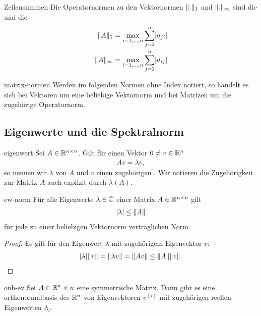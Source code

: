 \begin{Beispiel}{Zeilensummen}
  Die Operatornormen zu den Vektornormen $\lVert.\rVert_1$ und
  $\lVert.\rVert_\infty$ sind die  und die
  \begin{align}
    \lVert A\rVert_1 &= \max_{i=1,\dots,n} \sum_{j=1}^n \lvert a_{ji}\rvert\\
    \lVert A\rVert_\infty &= \max_{i=1,\dots,n} \sum_{j=1}^n \lvert a_{ij}\rvert
  \end{align}
\end{Beispiel}

\begin{Notation}{matrix-normen}
  Werden im folgenden Normen ohne Index notiert, so handelt es sich
  bei Vektoren um eine beliebige Vektornorm und bei Matrizen um die
  zugehörige Operatornorm.
\end{Notation}

\subsection{Eigenwerte und die Spektralnorm}

\begin{Definition}{eigenwert}
  Sei $A\in \mathbb R^{n\times n}$. Gilt für einen Vektor $0\neq v\in \mathbb R^n$
  \begin{gather}
    Av = \lambda v,
  \end{gather}
  so nennen wir $\lambda$  von $A$ und $v$ einen
  zugehörigen . Wir notieren die Zugehörigkeit zur
  Matrix $A$ auch explizit durch $\lambda(A)$.
\end{Definition}

\begin{Lemma}{ew-norm}
  Für alle Eigenwerte $\lambda\in\mathbb C$ einer Matrix $A\in\mathbb R^{n\times n}$ gilt
  \begin{gather}
    \lvert\lambda\rvert \le \lVert A\rVert
  \end{gather}
  für jede zu einer beliebigen Vektornorm verträglichen Norm.
\end{Lemma}

\begin{proof}
  Es gilt für den Eigenwert $\lambda$ mit zugehörigem Eigenvektor $v$:
  \begin{align}
    \lvert\lambda\rvert\lVert v\rVert = \lVert\lambda v\rVert = \lVert Av\rVert \le \lVert A\rVert\lVert v\rVert.
  \end{align}
\end{proof}

\begin{Satz}{onb-ev}
  Sei $A\in \mathbb R^n\times n$ eine symmetrische Matrix. Dann gibt es eine
  orthonormalbasis des $\mathbb R^n$ von Eigenvektoren $v^{(i)}$ mit zugehörigen
  reellen Eigenwerten $\lambda_i$.
\end{Satz}

